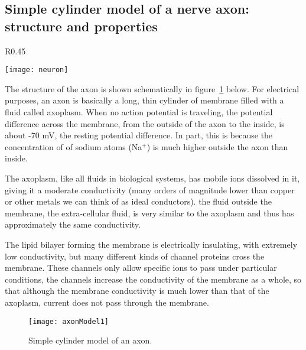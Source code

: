 \subsection*{Simple cylinder model of a nerve axon: structure and properties}
\begin{wrapfigure}{R}{0.45\textwidth}
  \vspace{-25pt}  
  \begin{center}
    \texttt{[image: neuron]}
  \end{center}
  \caption{Inside a cell wall.}
  \label{fig:neuron}
  \vspace{-5pt}
\end{wrapfigure}
The structure of the axon is shown schematically in figure~\ref{fig:axMod1} below.
For electrical purposes, an axon is basically a long, thin cylinder of membrane filled with a fluid called axoplasm.
When no action potential is traveling, the potential difference across the membrane, from the outside of the axon to the inside, is about -70 mV, the resting potential difference.
In part, this is because the concentration of of sodium atoms (Na$^{+}$) is much higher outside the axon than inside.
\par
The axoplasm, like all fluids in biological systems, has mobile ions dissolved in it, giving it a moderate conductivity (many orders of magnitude lower than copper or other metals we can think of as ideal conductors).
the fluid outside the membrane, the extra-cellular fluid, is very similar to the axoplasm and thus has approximately the same conductivity.
\par 
The lipid bilayer forming the membrane is electrically insulating, with extremely low conductivity, but many different kinds of channel proteins cross the membrane.
These channels only allow specific ions to pass under particular conditions,
the channels increase the conductivity of the membrane as a whole, so that although the membrane conductivity is much lower than that of the axoplasm, current does not pass through the membrane.
\begin{figure}[hbtp]
	\centering
	\texttt{[image: axonModel1]}
	\caption{Simple cylinder model of an axon.}
	\label{fig:axMod1}
\end{figure}


